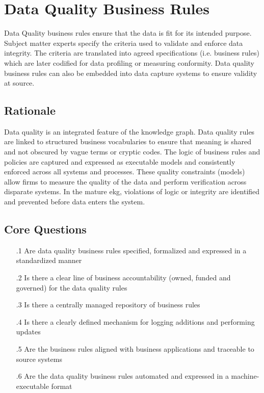 \section{Data Quality Business Rules}\label{sec:b-3-2} %

Data Quality business rules ensure that the data is fit for its intended purpose.
Subject matter experts specify the criteria used to validate and enforce data integrity.
The criteria are translated into agreed specifications (i.e. business rules) which are later codified for data profiling or measuring conformity.
Data quality business rules can also be embedded into data capture systems to ensure validity at source.

\subsection*{ Rationale}

Data quality is an integrated feature of the knowledge graph.
Data quality rules are linked to structured business vocabularies to ensure that meaning is shared and not obscured by vague terms or cryptic codes.
The logic of business rules and policies are captured and expressed as executable models and consistently enforced across all systems and processes.
These quality constraints (models) allow firms to measure the quality of the data and perform verification across disparate systems.
In the mature \acrshort{ekg}, violations of logic or integrity are identified and prevented before data enters the system.

\subsection*{Core Questions}

\begin{itemize}[leftmargin=.5in]

  \item [\thesection.1] Are data quality business rules specified, formalized and expressed in a standardized manner
  \item [\thesection.2] Is there a clear line of business accountability (owned, funded and governed) for the data quality rules
  \item [\thesection.3] Is there a centrally managed repository of business rules
  \item [\thesection.4] Is there a clearly defined mechanism for logging additions and performing updates
  \item [\thesection.5] Are the business rules aligned with business applications and traceable to source systems
  \item [\thesection.6] Are the data quality business rules automated and expressed in a machine-executable format

\end{itemize}
